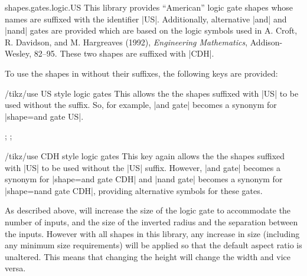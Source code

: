 \begin{pgflibrary}{shapes.gates.logic.US}
 This library provides ``American'' logic gate shapes whose names are 
  suffixed with the identifier |US|. Additionally,
  alternative |and| and |nand| gates are provided which are based on the 
  logic symbols used in A. Croft, R. Davidson, and M. Hargreaves (1992), 
  \emph{Engineering Mathematics}, Addison-Wesley, 82--95. These two 
  shapes are suffixed with |CDH|. 
\end{pgflibrary}

  To use the shapes in \tikzname{} without their suffixes, the 
  following keys are provided:
  
\begin{key}{/tikz/use US style logic gates}
	This allows the the shapes suffixed with |US| to be used without
	the suffix. So, for example, |and gate| becomes a synonym for
	|shape=and gate US|.
\begin{codeexample}[]
\tikz{};
\space
{};
\end{codeexample}
\end{key}

\begin{key}{/tikz/use CDH style logic gates}
	This key again allows the the shapes suffixed with |US| to be used 
	without	the |US| suffix. However, |and gate| becomes a synonym for
	|shape=and gate CDH| and |nand gate| becomes a synonym for
	|shape=nand gate CDH|, providing alternative symbols for these
	gates.
	
\begin{codeexample}[]
\end{codeexample}
\end{key}



As described above, \pgfname{} will increase the size of the 
logic gate to accommodate the number of inputs, and the size
of the inverted radius and the separation between the inputs.
However with all shapes in this library, any increase in size 
(including any minimum size requirements) will be applied so that 
the default aspect ratio is unaltered. This means that changing
the height will change the width and vice versa. 

